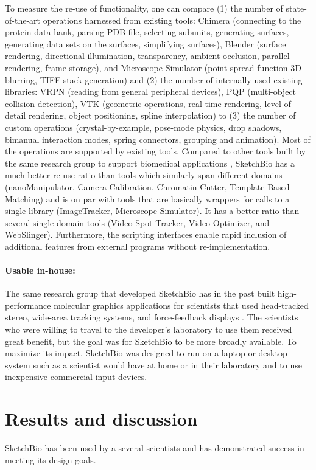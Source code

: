\documentclass[twocolumn]{bmcart}%
\begin{document}
To measure the re-use of functionality, one can compare (1) the number of state-of-the-art operations harnessed from existing tools: Chimera (connecting to the protein data bank, parsing PDB file, selecting subunits, generating surfaces, generating data sets on the surfaces, simplifying surfaces), Blender (surface rendering, directional illumination, transparency, ambient occlusion, parallel rendering, frame storage), and Microscope Simulator (point-spread-function 3D blurring, TIFF stack generation) and (2) the number of internally-used existing libraries: VRPN (reading from general peripheral devices), PQP (multi-object collision detection), VTK (geometric operations, real-time rendering, level-of-detail rendering, object positioning, spline interpolation) to (3) the number of custom operations (crystal-by-example, pose-mode physics, drop shadows, bimanual interaction modes, spring connectors, grouping and animation).  Most of the operations are supported by existing tools.
Compared to other tools built by the same research group to support biomedical applications \cite{CISMMapps}, SketchBio has a much better re-use ratio than tools which similarly span different domains (nanoManipulator, Camera Calibration, Chromatin Cutter, Template-Based Matching) and is on par with tools that are basically wrappers for calls to a single library (ImageTracker, Microscope Simulator).  It has a better ratio than several single-domain tools (Video Spot Tracker, Video Optimizer, and WebSlinger).
Furthermore, the scripting interfaces enable rapid inclusion of additional features from external programs without re-implementation.

\paragraph*{Usable in-house:} The same research group that developed SketchBio has in the past built high-performance molecular graphics applications for scientists that used head-tracked stereo, wide-area tracking systems, and force-feedback displays \cite{Arthur,Grant1998,Marshburn2005,Taylor1999,Taylor1997,Taylor1993}.
The scientists who were willing to travel to the developer's laboratory to use them received great benefit, but the goal was for SketchBio to be more broadly available.
To maximize its impact, SketchBio was designed to run on a laptop or desktop system such as a scientist would have at home or in their laboratory and to use inexpensive commercial input devices.

\section*{Results and discussion}
SketchBio has been used by a several scientists and has demonstrated success in meeting its design goals.
\end{document}
